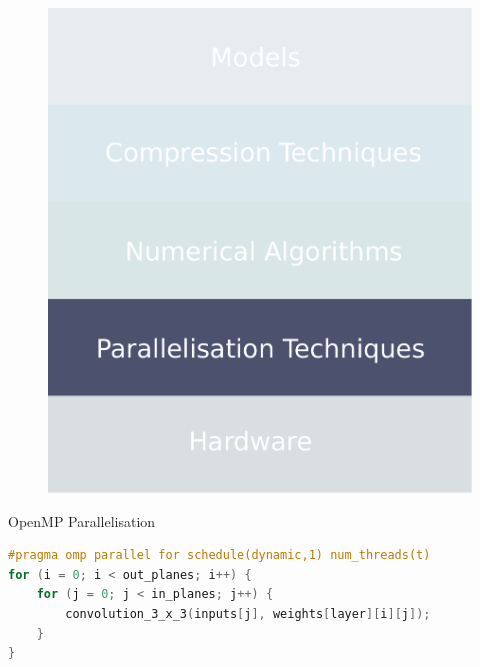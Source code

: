 \documentclass[xcolor=dvipsnames]{beamer}
\begin{document}
\begin{frame}

\begin{figure}
    \centering
    \includegraphics[width=0.6\linewidth]{images/parallelisations.pdf}
\end{figure}
\end{frame}


\begin{frame}[fragile]{OpenMP Parallelisation}

\begin{lstlisting}[language=C, columns=fullflexible]
#pragma omp parallel for schedule(dynamic,1) num_threads(t)
for (i = 0; i < out_planes; i++) {
	for (j = 0; j < in_planes; j++) {
		convolution_3_x_3(inputs[j], weights[layer][i][j]);
	}
}
\end{lstlisting}


\end{frame}
\end{document}
